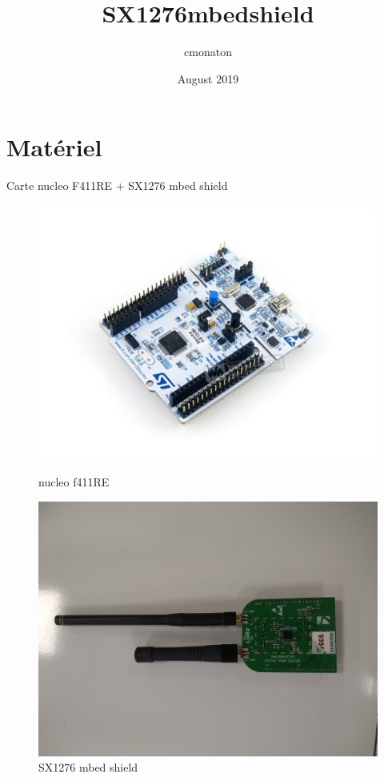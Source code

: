 \documentclass{article}
\title{SX1276mbedshield}
\author{cmonaton }
\date{August 2019}
\begin{document}
\maketitle

\section{Matériel}

Carte nucleo F411RE + SX1276 mbed shield

\begin{figure}[H]
  \centering
  \begin{minipage}[b]{0.4\textwidth}
    \includegraphics[width=\textwidth]{nucleo_f411re.jpeg}
    \caption{nucleo f411RE}
  \end{minipage}
  \hfill
  \begin{minipage}[b]{0.4\textwidth}
    \includegraphics[width=\textwidth]{sx1276mbedshield.jpg}
    \caption{SX1276 mbed shield}
  \end{minipage}
\end{figure}
\end{document}
